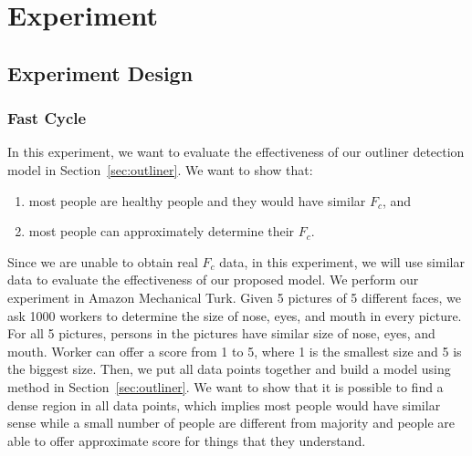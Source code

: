 \section{Experiment}\label{sec:exp}


\subsection{Experiment Design}

\subsubsection{Fast Cycle}
In this experiment, we want to evaluate the effectiveness of our outliner detection model in Section~\ref{sec:outliner}. 
We want to show that:
\begin{enumerate}
 \item most people are healthy people and they would have similar $F_c$, and 
 \item most people can approximately determine their $F_c$. 
\end{enumerate}


Since we are unable to obtain real $F_c$ data, in this experiment, we will use similar data to evaluate the 
effectiveness of our proposed model. 
We perform our experiment in Amazon Mechanical Turk. 
Given 5 pictures of 5 different faces, we ask 1000 workers to determine the size of nose, eyes, and mouth in every picture. 
For all 5 pictures, persons in the pictures have similar size of nose, eyes, and mouth. 
Worker can offer a score from 1 to 5, where 1 is the smallest size and 5 is the biggest size. 
Then, we put all data points together and build a model using method in Section~\ref{sec:outliner}. 
We want to show that it is possible to find a dense region in all data points, which implies 
most people would have similar sense while a small number of people are different from majority and people are able to 
offer approximate score for things that they understand. 


